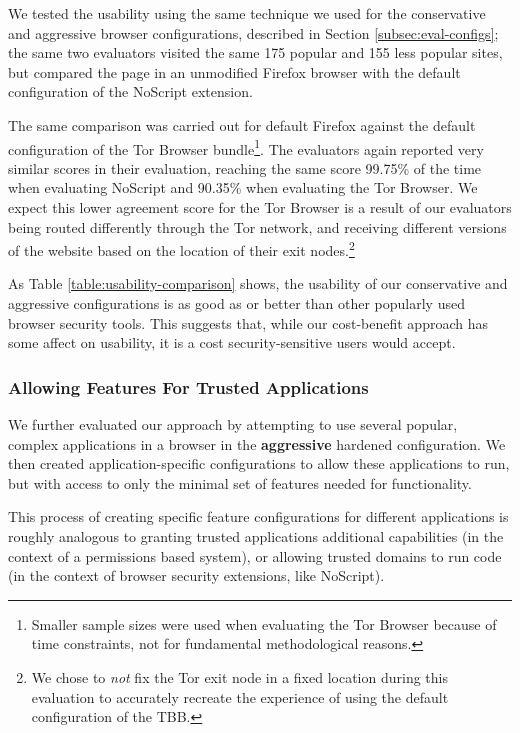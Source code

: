 We tested the usability using the same technique we used for the conservative
and aggressive browser configurations, described in Section
\ref{subsec:eval-configs}; the same two evaluators visited the
same 175 popular and 155 less popular sites, but compared the page in
an unmodified Firefox browser with the default configuration of the NoScript
extension.

The same comparison was carried out for default Firefox against
the default configuration of the Tor Browser bundle\footnote{Smaller sample
sizes were used when evaluating the Tor Browser because of time constraints,
not for fundamental methodological reasons.}.  The evaluators again
reported very similar scores in their evaluation, reaching the same score
99.75\% of the time when evaluating NoScript and 90.35\% when evaluating the
Tor Browser.  We expect this lower agreement score for the Tor Browser is
a result of our evaluators being routed differently through the Tor network, and
receiving different versions of the website based on the location of their
exit nodes.\footnote{We chose to \emph{not} fix the Tor exit node in a fixed
location during this evaluation to accurately recreate the experience of using
the default configuration of the TBB.}

As Table \ref{table:usability-comparison} shows, the usability of our
conservative and aggressive configurations is as good as or better than other
popularly used browser security tools.  This suggests that, while
our \WASs cost-benefit approach has some affect on usability, it is a
cost security-sensitive users would accept.


\subsubsection{Allowing Features For Trusted Applications}
We further evaluated our approach by attempting to use several popular,
complex \JS applications in a browser in the \textbf{aggressive} hardened
configuration.  We then created application-specific configurations to allow
these applications to run, but with access to only the minimal set of
features needed for functionality.

This process of creating specific feature configurations for different
applications is roughly analogous to granting trusted applications additional
capabilities (in the context of a permissions based system), or allowing trusted
domains to run \JS code (in the context of browser security extensions, like
NoScript).

